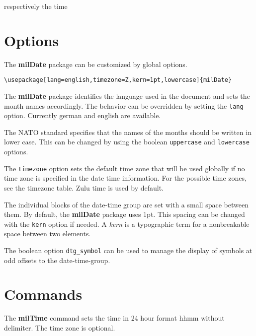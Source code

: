 \documentclass[a4paper,10pt]{scrarticle}
\begin{document}
respectively the time

\par\begin{center}
\end{center}\par

\section{Options}

The \textbf{milDate} package can be customized by global options.

\verb+\usepackage[lang=english,timezone=Z,kern=1pt,lowercase]{milDate}+

\noindent{} The \textbf{milDate} package identifies the language used in the document and sets the month names accordingly. The behavior can be overridden by setting the \verb+lang+ option.
Currently german and english are available.

\noindent{} The NATO standard specifies that the names of the months should be written in lower case. This can be changed by using the boolean \verb+uppercase+ and \verb+lowercase+ options.

\noindent{} The \verb+timezone+ option sets the default time zone that will be used globally if no time zone is specified in the date time information. For the possible time zones, see the timezone table. Zulu time is used by default.

\noindent{} The individual blocks of the date-time group are set with a small space between them. By default, the \textbf{milDate} package uses 1pt. This spacing can be changed with the \verb+kern+ option if needed. A \emph{kern} is a typographic term for a nonbreakable space between two elements.

\noindent{} The boolean option \verb+dtg_symbol+ can be used to manage the display of symbols at odd offsets to the date-time-group. 

\section{Commands}

\noindent{} The \textbf{milTime} command sets the time in 24 hour format hhmm without delimiter. The time zone is optional.
\end{document}
